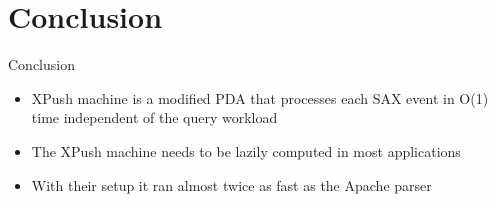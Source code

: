 \documentclass[mathserif,serif]{beamer}
\begin{document}
\section{Conclusion}
\begin{frame}{Conclusion}
  \begin{itemize}
    \item XPush machine is a modified PDA that processes each SAX event in O(1) time independent of the query workload
    \item The XPush machine needs to be lazily computed in most applications
    \item With their setup it ran almost twice as fast as the Apache parser
  \end{itemize}
\end{frame}
\end{document}
